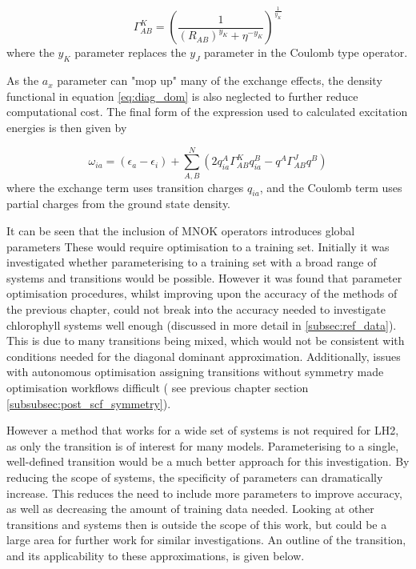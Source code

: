 \begin{equation}
\Gamma^K_{AB} = \left(\frac{1}{\left(R_{AB}\right)^{y_K} + \eta^{-y_K}} \right)^{\frac{1}{y_K}}
\end{equation}
%
where the $y_K$ parameter replaces the $y_J$ parameter in the Coulomb type operator.

As the $a_x$ parameter can "mop up" many of the exchange effects, the density functional
in equation \ref{eq:diag_dom} is also neglected to further reduce computational cost.
The final form of the expression used to calculated excitation energies is then 
given by

\begin{equation}
\omega_{ia} = \left(\epsilon_a - \epsilon_i\right) + \sum^N_{A,B}\left(2 q_{ia}^A \Gamma^K_{AB} q_{ia}^B - q^A \Gamma^J_{AB} q^B\right)
\end{equation}
%
where the exchange term uses transition charges $q_{ia}$, and the Coulomb term uses
partial charges from the ground state density.

It can be seen that the inclusion of MNOK operators introduces global parameters
These would require optimisation to a training set. Initially it was investigated
whether parameterising to a training set with a broad range of systems and transitions
would be possible. However it was found that parameter optimisation procedures, 
whilst improving upon the accuracy of the \dxtb methods of the previous chapter,
could not break into the accuracy needed to investigate chlorophyll systems well
enough (discussed in more detail in \ref{subsec:ref_data}). This is due to many
transitions being mixed, which would not be consistent with conditions needed for
the diagonal dominant approximation. Additionally, issues with autonomous optimisation
assigning transitions without symmetry made optimisation workflows difficult (
see previous chapter section \ref{subsubsec:post_scf_symmetry}).

However a method that works for a wide set of systems is not required for LH2,
as only the \Qy transition is of interest for many models. Parameterising to a 
single, well-defined transition would be a much better approach for this investigation.
By reducing the scope of systems, the specificity of parameters can dramatically increase. 
This reduces the need to include more parameters to improve accuracy, as well as 
decreasing the amount of training data needed. Looking at other transitions and
systems then is outside the scope of this work, but could be a large area for further
work for similar investigations. An outline of the \Qy transition, and its applicability
to these approximations, is given below.

